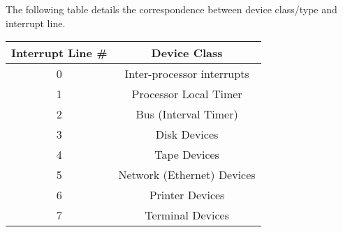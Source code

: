 The following table details the correspondence between device class/type and interrupt line.

\begin{center}
	\begin{tabular}{|c|c|}
		\hline
		Interrupt Line \# & Device Class\\
		\hline
		\hline
		\cellcolor{gray}0 & \cellcolor{gray}Inter-processor interrupts\\
		\hline
		\cellcolor{gray}1 & \cellcolor{gray}Processor Local Timer\\
		\hline
		2 & Bus (Interval Timer)\\
		\hline
		3 & Disk Devices\\
		\hline
		4 & Tape Devices\\
		\hline
		5 & Network (Ethernet) Devices\\
		\hline
		6 & Printer Devices\\
		\hline
		7 & Terminal Devices\\
		\hline
	\end{tabular}
\end{center}

